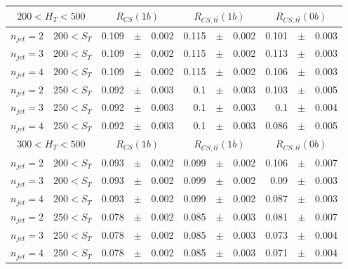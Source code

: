 \documentclass[12pt]{paper}
\begin{document}
\begin{table}[ht]
\begin{center}
\begin{tabular}{cc|rrr|rrr|rrr}
\multicolumn{2}{c|}{$200< H_{T}< 500$}&\multicolumn{3}{c|}{$R_{CS}(1b)$}&\multicolumn{3}{c|}{$R_{CS,t\overline{t}}(1b)$}&\multicolumn{3}{c}{$R_{CS,t\overline{t}}(0b)$}\\\hline
$n_{jet}=2$ & $200< S_{T}$ & 0.109&$\pm$&0.002 & 0.115&$\pm$&0.002 & 0.101&$\pm$&0.003\\
$n_{jet}=3$ & $200< S_{T}$ & 0.109&$\pm$&0.002 & 0.115&$\pm$&0.002 & 0.113&$\pm$&0.003\\
$n_{jet}=4$ & $200< S_{T}$ & 0.109&$\pm$&0.002 & 0.115&$\pm$&0.002 & 0.106&$\pm$&0.003\\
$n_{jet}=2$ & $250< S_{T}$ & 0.092&$\pm$&0.003 & 0.1&$\pm$&0.003 & 0.103&$\pm$&0.005\\
$n_{jet}=3$ & $250< S_{T}$ & 0.092&$\pm$&0.003 & 0.1&$\pm$&0.003 & 0.1&$\pm$&0.004\\
$n_{jet}=4$ & $250< S_{T}$ & 0.092&$\pm$&0.003 & 0.1&$\pm$&0.003 & 0.086&$\pm$&0.005\\
\hline
\multicolumn{2}{c|}{$300< H_{T}< 500$}&\multicolumn{3}{c|}{$R_{CS}(1b)$}&\multicolumn{3}{c|}{$R_{CS,t\overline{t}}(1b)$}&\multicolumn{3}{c}{$R_{CS,t\overline{t}}(0b)$}\\\hline
$n_{jet}=2$ & $200< S_{T}$ & 0.093&$\pm$&0.002 & 0.099&$\pm$&0.002 & 0.106&$\pm$&0.007\\
$n_{jet}=3$ & $200< S_{T}$ & 0.093&$\pm$&0.002 & 0.099&$\pm$&0.002 & 0.09&$\pm$&0.003\\
$n_{jet}=4$ & $200< S_{T}$ & 0.093&$\pm$&0.002 & 0.099&$\pm$&0.002 & 0.087&$\pm$&0.003\\
$n_{jet}=2$ & $250< S_{T}$ & 0.078&$\pm$&0.002 & 0.085&$\pm$&0.003 & 0.081&$\pm$&0.007\\
$n_{jet}=3$ & $250< S_{T}$ & 0.078&$\pm$&0.002 & 0.085&$\pm$&0.003 & 0.073&$\pm$&0.004\\
$n_{jet}=4$ & $250< S_{T}$ & 0.078&$\pm$&0.002 & 0.085&$\pm$&0.003 & 0.071&$\pm$&0.004\\
\end{tabular}
\end{center}
\end{table}
\end{document}
